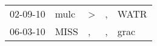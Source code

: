 \begin{supertabular}{p{0.07\textwidth}p{0.06\textwidth}p{0.02\textwidth}p{0.02\textwidth}p{0.06\textwidth}}
 02-09-10\textsuperscript{} &  mulc\textsuperscript{} &  \textgreater &  , &  WATR\textsuperscript{} \\
 06-03-10\textsuperscript{} &  MISS\textsuperscript{} &             , &  , &  grac\textsuperscript{} \\
\end{supertabular}
